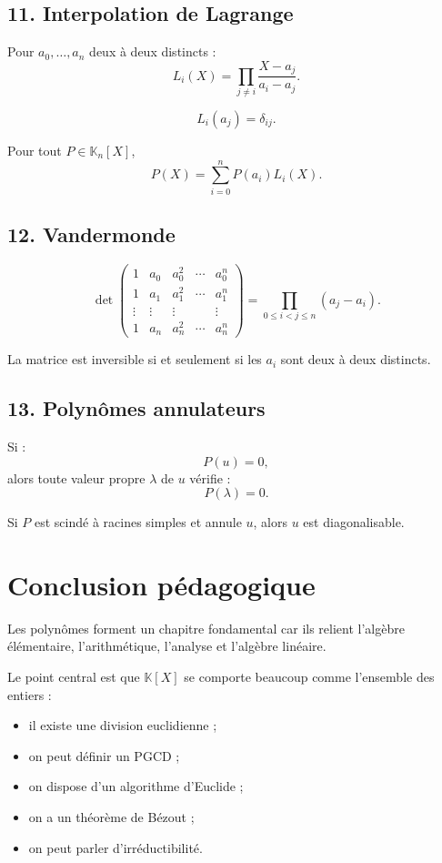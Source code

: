 \documentclass[11pt,a4paper]{article}
\newcommand{\K}{\mathbb K}
\begin{document}
\subsection*{11. Interpolation de Lagrange}

Pour \(a_0,\dots,a_n\) deux à deux distincts :
\[
L_i(X)=\prod_{j\neq i}\frac{X-a_j}{a_i-a_j}.
\]

\[
L_i(a_j)=\delta_{ij}.
\]

Pour tout \(P\in\K_n[X]\),
\[
P(X)=\sum_{i=0}^n P(a_i)L_i(X).
\]

\subsection*{12. Vandermonde}

\[
\det
\begin{pmatrix}
1&a_0&a_0^2&\cdots&a_0^n\\
1&a_1&a_1^2&\cdots&a_1^n\\
\vdots&\vdots&\vdots&&\vdots\\
1&a_n&a_n^2&\cdots&a_n^n
\end{pmatrix}
=
\prod_{0\leq i<j\leq n}(a_j-a_i).
\]

La matrice est inversible si et seulement si les \(a_i\) sont deux à deux distincts.

\subsection*{13. Polynômes annulateurs}

Si :
\[
P(u)=0,
\]
alors toute valeur propre \(\lambda\) de \(u\) vérifie :
\[
P(\lambda)=0.
\]

Si \(P\) est scindé à racines simples et annule \(u\), alors \(u\) est diagonalisable.

\section*{Conclusion pédagogique}

Les polynômes forment un chapitre fondamental car ils relient l'algèbre élémentaire, l'arithmétique, l'analyse et l'algèbre linéaire.

Le point central est que \(\K[X]\) se comporte beaucoup comme l'ensemble des entiers :
\begin{itemize}
    \item il existe une division euclidienne ;
    \item on peut définir un PGCD ;
    \item on dispose d'un algorithme d'Euclide ;
    \item on a un théorème de Bézout ;
    \item on peut parler d'irréductibilité.
\end{itemize}
\end{document}
